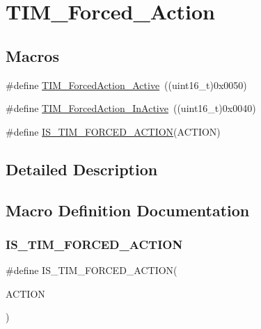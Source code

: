 \hypertarget{group___t_i_m___forced___action}{}\section{T\+I\+M\+\_\+\+Forced\+\_\+\+Action}
\label{group___t_i_m___forced___action}
\subsection*{Macros}
\begin{DoxyCompactItemize}
\item 
\#define \mbox{\hyperlink{group___t_i_m___forced___action_ga19d3769825f1dfdbdbde3edb60310b99}{T\+I\+M\+\_\+\+Forced\+Action\+\_\+\+Active}}~((uint16\+\_\+t)0x0050)
\item 
\#define \mbox{\hyperlink{group___t_i_m___forced___action_ga79656f2193ec5e12a15d0ae5b025d273}{T\+I\+M\+\_\+\+Forced\+Action\+\_\+\+In\+Active}}~((uint16\+\_\+t)0x0040)
\item 
\#define \mbox{\hyperlink{group___t_i_m___forced___action_gaa2cb16f281d32c95ab974dc5157bfa63}{I\+S\+\_\+\+T\+I\+M\+\_\+\+F\+O\+R\+C\+E\+D\+\_\+\+A\+C\+T\+I\+ON}}(A\+C\+T\+I\+ON)
\end{DoxyCompactItemize}


\subsection{Detailed Description}


\subsection{Macro Definition Documentation}
\mbox{\label{group___t_i_m___forced___action_gaa2cb16f281d32c95ab974dc5157bfa63}} 
\subsubsection{\texorpdfstring{IS\_TIM\_FORCED\_ACTION}{IS\_TIM\_FORCED\_ACTION}}
{\footnotesize\ttfamily \#define I\+S\+\_\+\+T\+I\+M\+\_\+\+F\+O\+R\+C\+E\+D\+\_\+\+A\+C\+T\+I\+ON(\begin{DoxyParamCaption}\item[{}]{A\+C\+T\+I\+ON }\end{DoxyParamCaption})}

